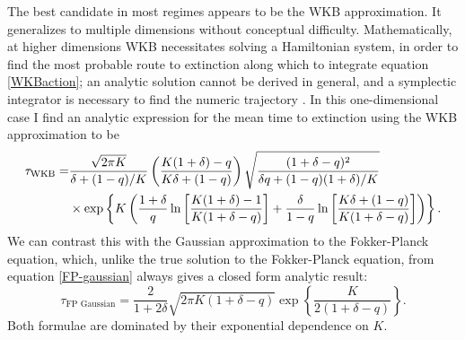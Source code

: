 The best candidate in most regimes appears to be the WKB approximation. 
It generalizes to multiple dimensions without conceptual difficulty.
Mathematically, at higher dimensions WKB necessitates solving a Hamiltonian system, in order to find the most probable route to extinction along which to integrate equation \ref{WKBaction}; an analytic solution cannot be derived in general, and a symplectic integrator is necessary to find the numeric trajectory \cite{Channell1990}. 
In this one-dimensional case I find an analytic expression for the mean time to extinction using the WKB approximation to be
\begin{align}
\tau_{\text{WKB}} = &\frac{\sqrt{2 \pi K}}{\delta+(1-q)/K} \left(\frac{K(1+\delta)-q}{K\delta + (1-q)}\right) \sqrt{\frac{(1+\delta-q)^2}{\delta q + (1-q)(1+\delta)/K}} \\
&\times \exp \left\{ K\left( \frac{1+\delta}{q}\ln\left[\frac{K(1+\delta)-1}{K(1+\delta-q)}\right] + \frac{\delta}{1-q}\ln\left[\frac{K\delta+(1-q)}{K(1+\delta-q)}\right] \right) \right\}. \notag
\end{align}
We can contrast this with the Gaussian approximation to the Fokker-Planck equation, which, unlike the true solution to the Fokker-Planck equation, from equation \ref{FP-gaussian} always gives a closed form analytic result:
\begin{equation}
\tau_{\text{FP Gaussian}} = \frac{2}{1+2\delta} \sqrt{2 \pi K (1+\delta-q)} \exp\left\{\frac{K}{2(1+\delta-q)} \right\}.
\end{equation}
Both formulae are dominated by their exponential dependence on $K$. 
